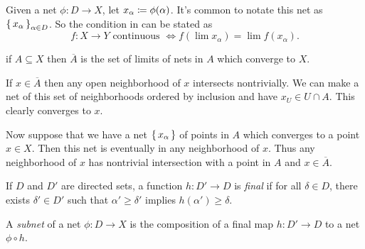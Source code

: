 \documentclass[letterpaper, 11pt, oneside]{book}
\begin{document}
Given a net $\phi\colon D \to X$, let $x_{\alpha} \coloneqq \phi(\alpha)$.
It's common to notate this net as $\set{x_{\alpha}}_{\alpha \in D}$.
So the condition in  can be stated as
\[
  f\colon X \to Y \text{ continuous } \iff f(\lim x_{\alpha}) = \lim f(x_{\alpha}).
\]

\begin{prop}
  if $A \subseteq X$ then $\overline{A}$ is the set of limits of nets in $A$ which converge to $X$.
\end{prop}
\begin{pf}
  If $x \in \overline{A}$ then any open neighborhood of $x$ intersects nontrivially.
  We can make a net of this set of neighborhoods ordered by inclusion and have $x_{U} \in U \cap A$.
  This clearly converges to $x$.

  Now suppose that we have a net $\set{x_{\alpha}}$ of points in $A$ which converges to a point $x \in X$.
  Then this net is eventually in any neighborhood of $x$.
  Thus any neighborhood of $x$ has nontrivial intersection with a point in $A$ and $x \in \overline{A}$.
\end{pf}

\begin{defn}
  If $D$ and $D'$ are directed sets, a function $h\colon D' \to D$ is \emph{final} if for all $\delta \in D$, there exists $\delta' \in D'$ such that $\alpha' \geq \delta'$ implies $h(\alpha') \geq \delta$.
\end{defn}

\begin{defn}[Subnets]
  A \emph{subnet} of a net $\phi\colon D \to X$ is the composition of a final map $h\colon D' \to D$ to a net $\phi \circ h$.
\end{defn}
\end{document}
